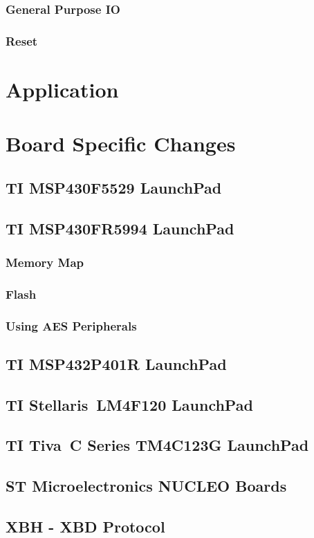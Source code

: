 \documentclass[twoside,11pt]{cergdoc}
\begin{document}
    \subsection{General Purpose IO}
    \subsection{Reset}
\chapter{Application}
\chapter{Board Specific Changes}
  \section{TI MSP430F5529 LaunchPad\texttrademark}
  \section{TI MSP430FR5994 LaunchPad\texttrademark}
    \subsection{Memory Map}
    \subsection{Flash}
    \subsection{Using AES Peripherals}
  \section{TI MSP432P401R LaunchPad\texttrademark}
  \section{TI Stellaris\textregistered~LM4F120 LaunchPad}
  \section{TI Tiva\texttrademark~C Series TM4C123G LaunchPad}
  \section{ST Microelectronics NUCLEO Boards}

\begin{appendix}
\chapter{XBH - XBD Protocol}
\end{appendix}
\end{document}
